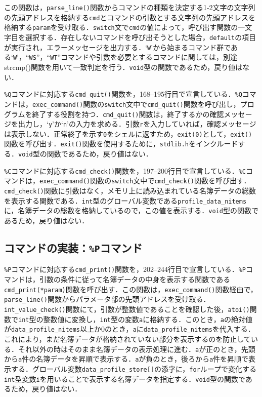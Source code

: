 この関数は，\verb|parse_line()|関数からコマンドの種類を決定する1-2文字の文字列の先頭アドレスを格納する\verb|cmd|とコマンドの引数とする文字列の先頭アドレスを格納する\verb|param|を受け取る．\verb|switch|文で\verb|cmd|の値によって，呼び出す関数の一文字目を選択する．存在しないコマンドを呼び出そうとした場合，\verb|default|の項目が実行され，エラーメッセージを出力する．‘\verb|W|’から始まるコマンド群である‘\verb|W|’，“\verb|WS|”，“\verb|WT|”コマンドや引数を必要とするコマンドに関しては，別途strcmp()関数を用いて一致判定を行う．\verb|void|型の関数であるため，戻り値はない．

\verb|%Q|コマンドに対応する\verb|cmd_quit()|関数を，168--195行目で宣言している．\verb|%Q|コマンドは，\verb|exec_command()|関数の\verb|switch|文中で\verb|cmd_quit()|関数を呼び出し，プログラムを終了する役割を持つ．\verb|cmd_quit()|関数は，終了するかの確認メッセージを出力し，‘\verb|y|’か‘\verb|n|’の入力を求める．引数\verb|r|を入力していれば，確認メッセージは表示しない．正常終了を示す\verb|0|をシェルに返すため，\verb|exit(0)|として，\verb|exit()|関数を呼び出す．\verb|exit()|関数を使用するために，\verb|stdlib.h|をインクルードする．\verb|void|型の関数であるため，戻り値はない．

\verb|%C|コマンドに対応する\verb|cmd_check()|関数を，197--200行目で宣言している．\verb|%C|コマンドは，\verb|exec_command()|関数の\verb|switch|文中で\verb|cmd_check()|関数を呼び出す．\verb|cmd_check()|関数に引数はなく，メモリ上に読み込まれている名簿データの総数を表示する関数である．\verb|int|型のグローバル変数である\verb|profile_data_nitems|に，名簿データの総数を格納しているので，この値を表示する．\verb|void|型の関数であるため，戻り値はない．

\subsection{コマンドの実装：\texttt{\%P}コマンド}

\verb|%P|コマンドに対応する\verb|cmd_print()|関数を，202--244行目で宣言している．\verb|%P|コマンドは，引数の条件に従って名簿データの中身を表示する関数である\verb|cmd_print(*param)|関数を呼び出す．この関数は，\verb|exec_command()|関数経由で，\verb|parse_line()|関数からパラメータ部の先頭アドレスを受け取る．\verb|int_value_check()|関数にて，引数が整数値であることを確認した後，\verb|atoi()|関数で\verb|int|型の整数値に変換し，\verb|int|型の変数\verb|a|に格納する．このとき，\verb|a|の絶対値が\verb|data_profile_nitems|以上か$0$のとき，\verb|a|に\verb|data_profile_nitems|を代入する．これにより，まだ名簿データが格納されていない部分を表示するのを防止している．それ以外の時はそのまま名簿データの表示処理に進む．\verb|a|が正のとき，先頭から\verb|a|件の名簿データを昇順で表示する．\verb|a|が負のとき，後ろから\verb|a|件を昇順で表示する．グローバル変数\verb|data_profile_store[]|の添字に，\verb|for|ループで変化する\verb|int|型変数\verb|i|を用いることで表示する名簿データを指定する．\verb|void|型の関数であるため，戻り値はない．

